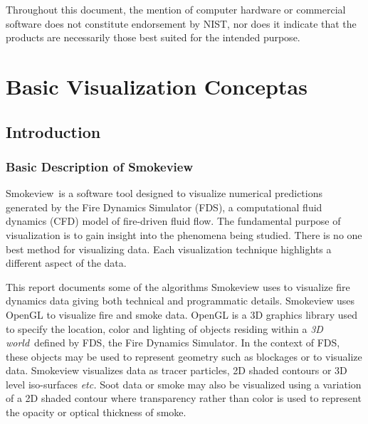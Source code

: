 \documentclass[11pt,twoside]{book}
\newcommand{\fds}{{FDS}}
\newcommand{\Smokeview}{{Smokeview}}
\begin{document}
Throughout this document, the mention of computer hardware or
commercial software does not constitute endorsement by NIST,
nor does
it indicate that the products are necessarily those
best suited for the
intended purpose.




\tableofcontents
\listoffigures

\mainmatter


\part{Basic Visualization Conceptas}
\chapter{Introduction}
\section{Basic Description of Smokeview}
\Smokeview\ is a software tool designed to visualize numerical
predictions generated by the Fire Dynamics Simulator (\fds),
a computational fluid dynamics (CFD) model of fire-driven fluid
flow\cite{FDS_Tech_Guide_5}.  The fundamental purpose of visualization is to gain
insight into the phenomena being studied.  There is no one best method for visualizing data.
Each visualization technique highlights a different aspect of the data.

This report documents some of the algorithms Smokeview uses to visualize fire dynamics data giving both technical and programmatic details.
Smokeview uses OpenGL to visualize fire and smoke data.  OpenGL
is a 3D graphics library used to specify the location, color and
lighting of objects residing within a {\em 3D world}\ defined by FDS,
the Fire Dynamics Simulator. In the context of FDS, these objects
may be used to represent geometry such as blockages or to
visualize data. Smokeview visualizes data as tracer particles, 2D
shaded contours or 3D level iso-surfaces {\em etc.}  Soot data or
smoke may also be visualized using a variation of a 2D shaded
contour where transparency rather than color is used to represent
the opacity or optical thickness of smoke.
\end{document}
